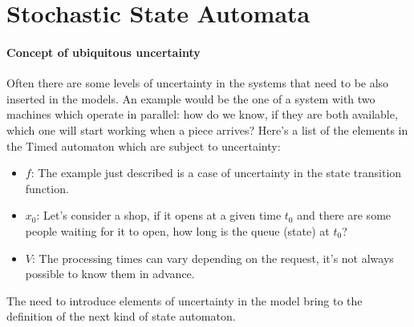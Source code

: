 \documentclass[12pt,a4paper]{article}
\begin{document}
\section{Stochastic State Automata}
\paragraph{Concept of ubiquitous uncertainty}
Often there are some levels of uncertainty in the systems that need to be also inserted in the models. An example would be the one of a system with two machines which operate in parallel: how do we know, if they are both available, which one will start working when a piece arrives? Here’s a list of the elements in the Timed automaton which are subject to uncertainty:
\begin{itemize}
\item $f$: The example just described is a case of uncertainty in the state transition function.
\item $x_0$: Let’s consider a shop, if it opens at a given time $t_0$ and there are some people waiting for it to open, how long is the queue (state) at $t_0$? 
\item $V$: The processing times can vary depending on the request, it’s not always possible to know them in advance.
\end{itemize}
The need to introduce elements of uncertainty in the model bring to the definition of the next kind of state automaton.
\end{document}
